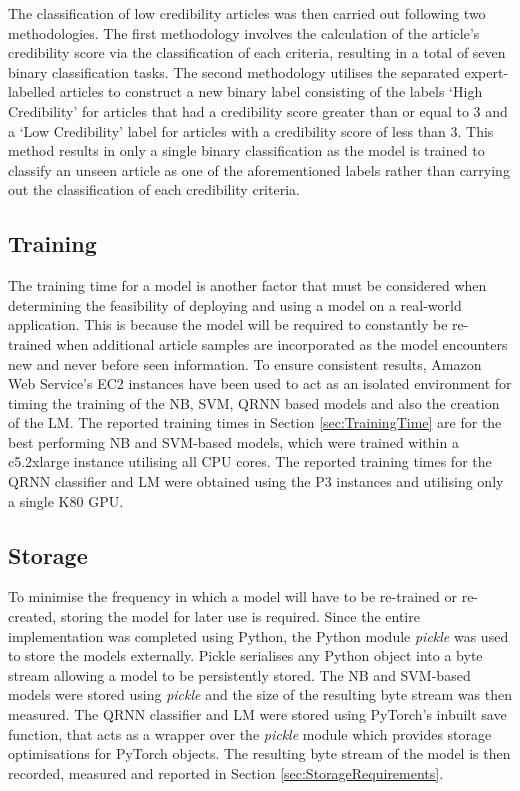 \documentclass[a4paper,twoside,phd]{BYUPhys}
\begin{document}
The classification of low credibility articles was then carried out following two methodologies. The first methodology involves the calculation of the article's credibility score via the classification of each criteria, resulting in a total of seven binary classification tasks. The second methodology utilises the separated expert-labelled articles to construct a new binary label consisting of the labels `High Credibility' for articles that had a credibility score greater than or equal to 3 and a `Low Credibility' label for articles with a credibility score of less than 3. This method results in only a single binary classification as the model is trained to classify an unseen article as one of the aforementioned labels rather than carrying out the classification of each credibility criteria.

\subsection{Training}
\label{sec:TrainingExperiments}
The training time for a model is another factor that must be considered when determining the feasibility of deploying and using a model on a real-world application. This is because the model will be required to constantly be re-trained when additional article samples are incorporated as the model encounters new and never before seen information. To ensure consistent results, Amazon Web Service's EC2 instances \cite{AWS} have been used to act as an isolated environment for timing the training of the NB, SVM, QRNN based models and also  the creation of the LM. The reported training times in Section \ref{sec:TrainingTime} are for the best performing NB and SVM-based models, which were trained within a c5.2xlarge instance utilising all CPU cores. The reported training times for the QRNN classifier and LM were obtained using the P3 instances and utilising only a single K80 GPU.


\subsection{Storage}
\label{sec:StorageExperiments}
To minimise the frequency in which a model will have to be re-trained or re-created, storing the model for later use is required. Since the entire implementation was completed using Python, the Python module \textit{pickle} was used to store the models externally. Pickle serialises any Python object into a byte stream allowing a model to be persistently stored. The NB and SVM-based models were stored using \textit{pickle} and the size of the resulting byte stream was then measured. The QRNN classifier and LM were stored using PyTorch's inbuilt save function, that acts as a wrapper over the \textit{pickle} module which provides storage optimisations for PyTorch objects. The resulting byte stream of the model is then recorded, measured and reported in Section \ref{sec:StorageRequirements}.
\end{document}
